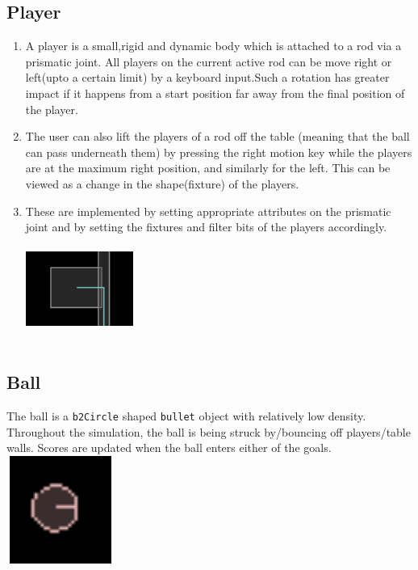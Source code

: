 \documentclass{article}
\begin{document}
\subsection{Player}
\begin{enumerate}
\item A player is a small,rigid and dynamic body which is attached to a rod via a prismatic joint. All players on the current active rod can be move right or left(upto a certain limit) by a keyboard input.Such a rotation has greater impact if it happens from a start position far away from the final position of the player.
\item The user can also lift the players of a rod off the table (meaning that the ball can pass underneath them) by pressing the right motion key while the players are at the maximum right position, and similarly for the left. This can be viewed as a change in the shape(fixture) of the players.
\item These are implemented by setting appropriate attributes on the prismatic joint and by setting the fixtures and filter bits of the players accordingly.\\
\includegraphics[width=100pt,height=100pt]{Player}
\end{enumerate}

\subsection{Ball}
The ball is a \texttt{b2Circle} shaped \texttt{bullet} object with relatively low density. Throughout the simulation, the ball is being struck by/bouncing off players/table walls. Scores are updated when the ball enters either of the goals.\\
\includegraphics[width=100pt,height=100pt]{Ball}
\end{document}
